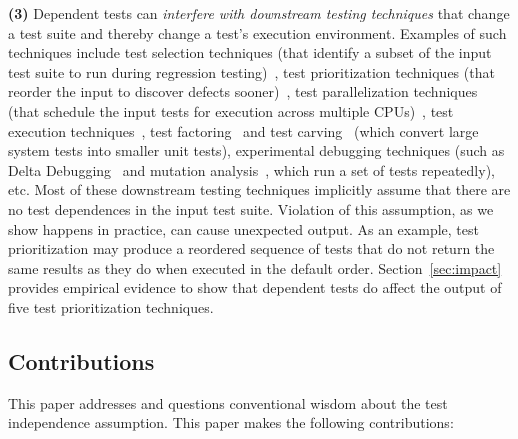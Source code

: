 \textbf{(3)}
Dependent tests can \textit{interfere with downstream testing
techniques} that change a test suite and thereby change a test's execution environment.
Examples of such techniques include
test selection techniques (that identify a subset of
the input test suite to run during
regression testing)~\cite{harroldetal:OOPSLA:2001, Orso:2004:SRT,
Briand:2009:ART, Zhang:2012:RMT, Nanda:2011:RTP, hsu09may},
test prioritization techniques (that reorder the
input to discover defects sooner)~\cite{Elbaum:2000:PTC:347324.348910, Kim:2002:HTP:581339.581357, Rummel:2005:TPR:1066677.1067016, Srivastava:2002:EPT:566172.566187, Jiang:2009:ART},
test parallelization techniques (that schedule the input tests for execution across multiple
CPUs)~\cite{Misailovic:2007}, test execution techniques~\cite{Kim:2013:OUT},
test factoring~\cite{Saff:2005, Wu:2010:LRV} and test carving~\cite{Elbaum:2006} (which
convert large system tests into smaller unit tests),
experimental debugging techniques (such as Delta
Debugging~\cite{Zeller:2002, Steimann:2013, Zhang:2013:IMF} and mutation
analysis~\cite{Zhang:2012:RMT, Schuler:2009:EMT, Zhang:2013:FMT},
which run a set of tests repeatedly), etc. 
Most of these downstream testing techniques implicitly assume that
there are no test dependences in the input test suite. Violation of
this assumption, as we show happens in practice, can cause unexpected
output. %
As an example, test prioritization may produce a reordered sequence
of tests that do not
return the same results as they do when executed in
the default order. Section~\ref{sec:impact}
provides empirical evidence to show that
dependent tests do affect the output of five test prioritization
techniques.


\subsection{Contributions}
\label{sec:contributions}

This paper addresses and questions
conventional wisdom about the test independence assumption. 
This paper makes the following contributions:

